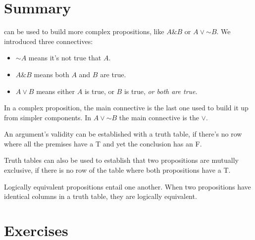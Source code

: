 \documentclass[justified]{tufte-book}
\providecommand{\tightlist}{%
  \setlength{\itemsep}{0pt}\setlength{\parskip}{0pt}}
\renewcommand{\neg}{\mathbin{\sim}}
\renewcommand{\wedge}{\mathbin{\&}}
\theoremstyle{definition}
\theoremstyle{definition}
\theoremstyle{definition}
\theoremstyle{remark}
\begin{document}
\hypertarget{summary}{%
\section{Summary}\label{summary}}

 can be used to build more complex propositions, like \(A \wedge B\) or \(A \vee \neg B\). We introduced three connectives:

\begin{itemize}
\tightlist
\item
  \(\neg A\) means it's not true that \(A\).
\item
  \(A \wedge B\) means both \(A\) and \(B\) are true.
\item
  \(A \vee B\) means either \(A\) is true, or \(B\) is true, \emph{or both are true}.
\end{itemize}

In a complex proposition, the main connective is the last one used to build it up from simpler components. In \(A \vee \neg B\) the main connective is the \(\vee\).

An argument's validity can be established with a truth table, if there's no row where all the premises have a T and yet the conclusion has an F.

Truth tables can also be used to establish that two propositions are mutually exclusive, if there is no row of the table where both propositions have a T.

Logically equivalent propositions entail one another. When two propositions have identical columns in a truth table, they are logically equivalent.

\hypertarget{exercises-2}{%
\section*{Exercises}\label{exercises-2}}
\end{document}
